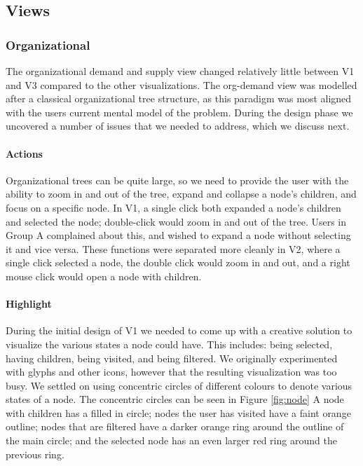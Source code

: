 \documentclass[journal]{vgtc}                %
\begin{document}
\subsection{Views}
\subsubsection{Organizational}
The organizational demand and supply view changed relatively little between V1 and V3 compared to the other visualizations.  The org-demand view was modelled after a classical organizational tree structure, as this paradigm was most aligned with the users current mental model of the problem.  During the design phase we uncovered a number of issues that we needed to address, which we discuss next.

\paragraph{Actions}
Organizational trees can be quite large, so we need to provide the user with the ability to zoom in and out of the tree, expand and collapse a node's children, and focus on a specific node.  In V1, a single click both expanded a node's children and selected the node; double-click would zoom in and out of the tree.  Users in Group A complained about this, and wished to expand a node without selecting it and vice versa. These functions were separated more cleanly in V2, where a single click selected a node, the double click would zoom in and out, and a right mouse click would open a node with children.

\paragraph{Highlight}
During the initial design of V1 we needed to come up with a creative solution to visualize the various states a node could have.  This includes: being selected, having children, being visited, and being filtered.  We originally experimented with glyphs and other icons, however that the resulting visualization was too busy.  We settled on using concentric circles of different colours to denote various states of a node. The concentric circles can be seen in Figure \ref{fig:node}  A node with children has a filled in circle; nodes the user has visited have a faint orange outline; nodes that are filtered have a darker orange ring around the outline of the main circle; and the selected node has an even larger red ring around the previous ring.  
\end{document}
